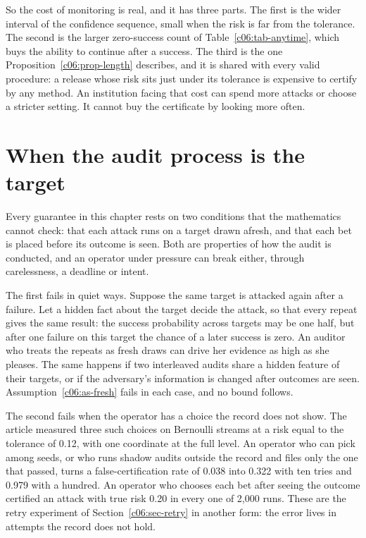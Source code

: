 So the cost of monitoring is real, and it has three parts. The first is the wider
interval of the confidence sequence, small when the risk is far from the
tolerance. The second is the larger zero-success count of
Table~\ref{c06:tab-anytime}, which buys the ability to continue after a success.
The third is the one Proposition~\ref{c06:prop-length} describes, and it is shared
with every valid procedure: a release whose risk sits just under its tolerance is
expensive to certify by any method. An institution facing that cost can spend more
attacks or choose a stricter setting. It cannot buy the certificate by looking more
often.

\section{When the audit process is the target}\label{c06:sec-process}

Every guarantee in this chapter rests on two conditions that the mathematics
cannot check: that each attack runs on a target drawn afresh, and that each bet is
placed before its outcome is seen. Both are properties of how the audit is
conducted, and an operator under pressure can break either, through carelessness,
a deadline or intent.

The first fails in quiet ways. Suppose the same target is attacked again after a
failure. Let a hidden fact about the target decide the attack, so that every repeat
gives the same result: the success probability across targets may be one half, but
after one failure on this target the chance of a later success is zero. An auditor
who treats the repeats as fresh draws can drive her evidence as high as she
pleases. The same happens if two interleaved audits share a hidden feature of their
targets, or if the adversary's information is changed after outcomes are seen.
Assumption~\ref{c06:as-fresh} fails in each case, and no bound follows.

The second fails when the operator has a choice the record does not show. The
article measured three such choices on Bernoulli streams at a risk equal to the
tolerance of 0.12, with one coordinate at the full level. An operator who can pick
among seeds, or who runs shadow audits outside the record and files only the one
that passed, turns a false-certification rate of 0.038 into 0.322 with ten tries and
0.979 with a hundred. An operator who chooses each bet after seeing the outcome
certified an attack with true risk 0.20 in every one of 2,000 runs.
These are the retry experiment of Section~\ref{c06:sec-retry} in another form: the
error lives in attempts the record does not hold.

